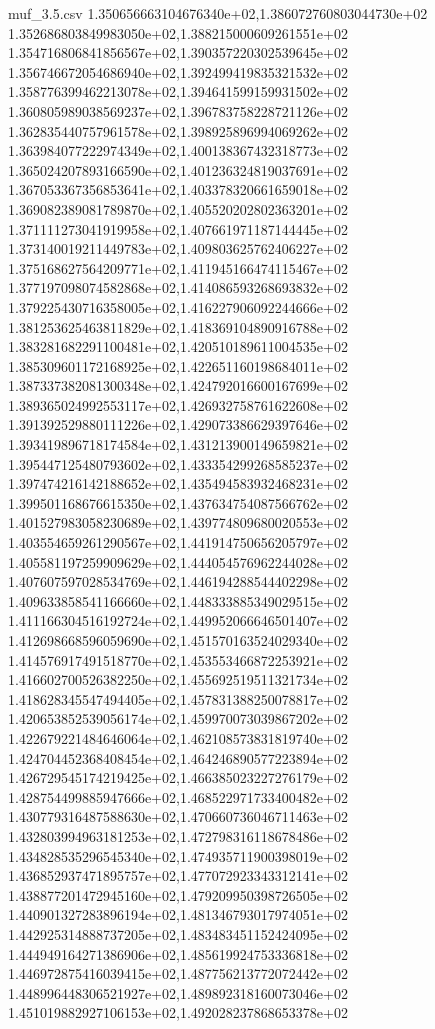 \begin{filecontents*}{muf_3.5.csv}
1.350656663104676340e+02,1.386072760803044730e+02
1.352686803849983050e+02,1.388215000609261551e+02
1.354716806841856567e+02,1.390357220302539645e+02
1.356746672054686940e+02,1.392499419835321532e+02
1.358776399462213078e+02,1.394641599159931502e+02
1.360805989038569237e+02,1.396783758228721126e+02
1.362835440757961578e+02,1.398925896994069262e+02
1.363984077222974349e+02,1.400138367432318773e+02
1.365024207893166590e+02,1.401236324819037691e+02
1.367053367356853641e+02,1.403378320661659018e+02
1.369082389081789870e+02,1.405520202802363201e+02
1.371111273041919958e+02,1.407661971187144445e+02
1.373140019211449783e+02,1.409803625762406227e+02
1.375168627564209771e+02,1.411945166474115467e+02
1.377197098074582868e+02,1.414086593268693832e+02
1.379225430716358005e+02,1.416227906092244666e+02
1.381253625463811829e+02,1.418369104890916788e+02
1.383281682291100481e+02,1.420510189611004535e+02
1.385309601172168925e+02,1.422651160198684011e+02
1.387337382081300348e+02,1.424792016600167699e+02
1.389365024992553117e+02,1.426932758761622608e+02
1.391392529880111226e+02,1.429073386629397646e+02
1.393419896718174584e+02,1.431213900149659821e+02
1.395447125480793602e+02,1.433354299268585237e+02
1.397474216142188652e+02,1.435494583932468231e+02
1.399501168676615350e+02,1.437634754087566762e+02
1.401527983058230689e+02,1.439774809680020553e+02
1.403554659261290567e+02,1.441914750656205797e+02
1.405581197259909629e+02,1.444054576962244028e+02
1.407607597028534769e+02,1.446194288544402298e+02
1.409633858541166660e+02,1.448333885349029515e+02
1.411166304516192724e+02,1.449952066646501407e+02
1.412698668596059690e+02,1.451570163524029340e+02
1.414576917491518770e+02,1.453553466872253921e+02
1.416602700526382250e+02,1.455692519511321734e+02
1.418628345547494405e+02,1.457831388250078817e+02
1.420653852539056174e+02,1.459970073039867202e+02
1.422679221484646064e+02,1.462108573831819740e+02
1.424704452368408454e+02,1.464246890577223894e+02
1.426729545174219425e+02,1.466385023227276179e+02
1.428754499885947666e+02,1.468522971733400482e+02
1.430779316487588630e+02,1.470660736046711463e+02
1.432803994963181253e+02,1.472798316118678486e+02
1.434828535296545340e+02,1.474935711900398019e+02
1.436852937471895757e+02,1.477072923343312141e+02
1.438877201472945160e+02,1.479209950398726505e+02
1.440901327283896194e+02,1.481346793017974051e+02
1.442925314888737205e+02,1.483483451152424095e+02
1.444949164271386906e+02,1.485619924753336818e+02
1.446972875416039415e+02,1.487756213772072442e+02
1.448996448306521927e+02,1.489892318160073046e+02
1.451019882927106153e+02,1.492028237868653378e+02

\end{filecontents*}
